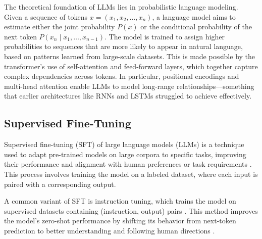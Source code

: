 The theoretical foundation of LLMs lies in probabilistic language modeling. Given a sequence of tokens \( x = (x_1, x_2, \dots, x_n) \), a language model aims to estimate either the joint probability \( P(x) \) or the conditional probability of the next token \( P(x_n \mid x_1, \dots, x_{n-1}) \). The model is trained to assign higher probabilities to sequences that are more likely to appear in natural language, based on patterns learned from large-scale datasets. This is made possible by the transformer's use of self-attention and feed-forward layers, which together capture complex dependencies across tokens. In particular, positional encodings and multi-head attention enable LLMs to model long-range relationships—something that earlier architectures like RNNs and LSTMs struggled to achieve effectively.



\subsection{Supervised Fine-Tuning}

Supervised fine-tuning (SFT) of large language models (LLMs) is a technique used to adapt pre-trained models on large corpora to specific tasks, improving their performance and alignment with human preferences or task requirements \citep{Wang2023AligningLargeLanguageModels}. This process involves training the model on a labeled dataset, where each input is paired with a corresponding output.

A common variant of SFT is instruction tuning, which trains the model on supervised datasets containing (instruction, output) pairs \citep{Wei2022FinetunedLMZeroShot}. This method improves the model’s zero-shot performance by shifting its behavior from next-token prediction to better understanding and following human directions \citep{Zhang2024InstructionTuningLLM}. 


